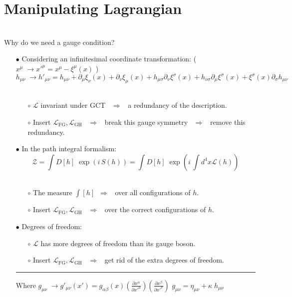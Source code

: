 \documentclass[aspectratio=169,usenames,dvipsnames]{beamer}
\begin{document}
\section{\bf Manipulating Lagrangian}
\begin{frame}{\centering {}\\ Why do we need a gauge condition?} \small
{}
  \begin{itemize}
  \item[$\bullet$] Considering an infinitesimal coordinate transformation: \footnotesize
    \Big (\unboldmath $x^{\mu} \; \rightarrow x'^{\mu} = x^{\mu} - \xi^{\mu}(x)$
    \Big)
   $$ h_{\mu\nu} \; \rightarrow h'_{\mu\nu}  = h_{\mu\nu} + \partial_{\mu}
   \xi_{\nu}(x) + \partial_{\nu} \xi_{\mu}(x) + h_{\mu\sigma} \partial_{\nu}
   \xi^{\sigma}(x) + h_{\nu\sigma} \partial_{\mu} \xi^{\sigma}(x) +
   \xi^{\sigma}(x)  \partial_{\sigma} h_{\mu\nu} $$ \\ 
   \begin{itemize}
   \scriptsize\item[$\circ$] $\mathcal{L}$ invariant under GCT \, $\Rightarrow$ \, a redundancy of the description.
   \item[$\circ$] Insert $\mathcal{L}_{\text{FG}},\mathcal{L}_{\text{GH}}$ \, $\Rightarrow$ \, break this gauge symmetry \, $\Rightarrow$ \, remove this redundancy.
   \end{itemize} \vspace{2.5mm}
   \small\item[$\bullet$]{In the path integral formalism:}\footnotesize
    $$ \mathcal{Z} = \int D[h] \; \exp( i \, S(h)  ) = \int D[h] \; \exp( i
    \,\int d^4x  \mathcal{L} (h)  ) $$\\
   \begin{itemize}
   \scriptsize\item[$\circ$] The measure $\int [h] $\, $\Rightarrow$ \, over all configurations of \(h\).
   \item[$\circ$] Insert $\mathcal{L}_{\text{FG}},\mathcal{L}_{\text{GH}}$ \,
     $\Rightarrow$ \, over the correct
     configurations of \(h\).
   \end{itemize} \vspace{2.5mm}
   \small\item[$\bullet$]{Degrees of freedom:}\\ 
   \begin{itemize}
   \scriptsize\item[$\circ$] $\mathcal{L}$ has more degrees of freedom than its gauge boson.
   \item[$\circ$] Insert $\mathcal{L}_{\text{FG}},\mathcal{L}_{\text{GH}}$ \, $\Rightarrow$ \, get rid of the extra degrees of freedom.
   \end{itemize}
   \textcolor{LUCopper}{\rule{\textwidth}{1pt}}
   \raggedright\tiny{Where $ g_{\mu\nu} \; \rightarrow g'_{\mu\nu}(x')  = g_{\alpha\beta}(x) (\frac{\partial x^{\alpha}}{\partial x'^{\mu}}) (\frac{\partial x^{\beta}}{\partial x'^{\nu}})  $ \hfill $g_{\mu\nu}=   \eta_{\mu\nu} +  \kappa \; h_{\mu \nu}$ }  \\[50mm]
  \end{itemize}
\end{frame}
\end{document}
